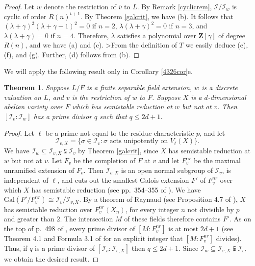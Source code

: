 \documentclass{amsart}
\def\Z{{\mathbf Z}}
\def\Gal{\mathrm{Gal}}
\def\I{{\mathcal I}}
\def\II{{{\mathcal I}_{v,X}}}
\newtheorem{thm}{Theorem}[section]
\theoremstyle{definition}
\begin{document}
\begin{proof}
Let $w$ denote the restriction of ${\bar v}$ to $L$.
By Remark \ref{cyclicrem}, $\I/\I_{w}$ is cyclic of
order $R(n)^{t+1}$. 
By Theorem \ref{galcrit}, we have (b).
It follows that
$(\lambda + \gamma)^2(\lambda + \gamma - 1)^2 = 0$ if $n = 2$, 
$\lambda(\lambda + \gamma)^2 = 0$ if $n = 3$, 
and
$\lambda(\lambda + \gamma) = 0$ if $n = 4$. 
Therefore, $\lambda$ satisfies a polynomial over
$\Z[\gamma]$ of degree $R(n)$, and we have (a) and (c). 
>From the definition of $T$ we easily deduce (e), (f), and (g).
Further, (d) follows from (b).
\end{proof}

We will apply the following result only in Corollary \ref{4326cor}e.

\begin{thm}
\label{divby23prop}
Suppose $L/F$ is a finite separable field extension, 
$w$ is a discrete valuation on $L$, 
and $v$ is the restriction of $w$ to $F$. 
Suppose $X$ is a $d$-dimensional abelian variety over $F$
which has semistable reduction at $w$ but not at $v$.
Then $[\I_{v}:\I_{w}]$ has a prime divisor $q$ such that 
$q \le 2d + 1$.
\end{thm}

\begin{proof}
Let $\ell$ be a prime not equal to the residue characteristic $p$,
and let 
$$\II = 
\{\sigma \in \I_{v} : 
\sigma \text{ acts unipotently on } V_{\ell}(X) \}.$$
We have  
$\I_{w} \subseteq \II \subsetneqq \I_{v}$ by Theorem \ref{galcrit}, 
since $X$ has semistable reduction at $w$ but not at $v$. 
Let $F_{v}$ be the completion of $F$ at $v$ and let
$F_{v}^{nr}$ be the maximal unramified extension 
of $F_{v}$.  
Then $\II$ is an open normal subgroup of $\I_{v}$, 
is independent of $\ell$,  
and cuts out the smallest Galois extension $F'$ of $F_{v}^{nr}$ 
over which $X$ has semistable reduction (see pp.~354--355
of \cite{SGA}). We have $\Gal(F'/F_{v}^{nr}) \cong \I_{v}/\II$. 
By a theorem of Raynaud (see Proposition 4.7 of \cite{SGA}),
$X$ has semistable reduction over $F_{v}^{nr}(X_{n})$,
for every integer $n$ not divisible by $p$ and greater than $2$.
The intersection $M$ of these fields therefore contains $F'$.
As on the top of p.~498 of \cite{SerreTate}, 
every prime divisor of $[M:F_{v}^{nr}]$ is at most $2d+1$
(see Theorem 4.1 and Formula 3.1 of \cite{JPAA} for 
an explicit integer that $[M:F_{v}^{nr}]$ divides).
Thus, if $q$ is a prime divisor of $[\I_{v}:\II]$ 
then $q \le 2d+1$. 
Since $\I_{w} \subseteq \II \subsetneqq \I_{v}$, 
we obtain the desired result.
\end{proof}
\end{document}
